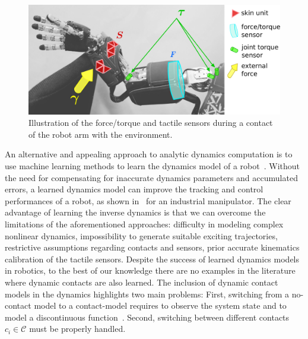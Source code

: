     \begin{figure}[t]
        \centering
        \includegraphics[width=.99\columnwidth]{fig/concept_gray_new}		
        \caption{Illustration of the force/torque and tactile sensors during a contact of the robot arm with the environment.}
        \label{fig:concept}
        \figspace
    \end{figure}
An alternative and appealing approach to analytic dynamics computation is to use machine learning methods to learn the dynamics model of a robot~\cite{Nguyen-Tuong2008,Vijayakumar2000,Deisenroth2012}. 
Without the need for compensating for inaccurate dynamics parameters and accumulated errors, a learned dynamics model can improve the tracking and control performances of a robot, as shown in~\cite{Nguyen-Tuong2011} for an industrial manipulator.
The clear advantage of learning the inverse dynamics is that we can overcome the limitations of the aforementioned approaches: difficulty in modeling complex nonlinear dynamics, impossibility to generate suitable exciting trajectories, restrictive assumptions regarding contacts and sensors, prior accurate kinematics calibration of the tactile sensors.
Despite the success of learned dynamics models in robotics, to the best of our knowledge there are no examples in the literature where dynamic contacts are also learned. 
The inclusion of dynamic contact models in the dynamics highlights two main problems:
First, switching from a no-contact model to a contact-model requires to observe the system state and to model a discontinuous function~\cite{Toussaint2005}. 
Second, switching between different contacts $c_i \in\mathcal{C}$ must be properly handled. %

